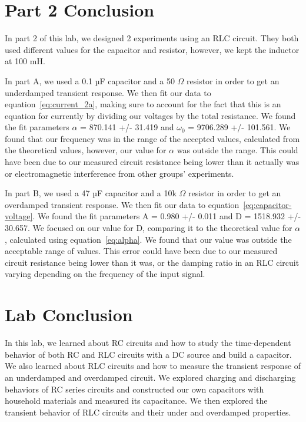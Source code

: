 \documentclass[11pt]{article}
\let\oldsection\section
\renewcommand\section{\clearpage\oldsection}
\begin{document}
    \section{Part 2 Conclusion}\label{sec:part2_conclusion}
    In part 2 of this lab, we designed 2 experiments using an RLC circuit. They both used different values for the capacitor and resistor, however, we kept the inductor at 100 mH.

    In part A, we used a  0.1 µF capacitor and a 50 $\Omega$ resistor in order to get an underdamped transient response. We then fit our data to equation~\ref{eq:current_2a}, making sure to account for the fact that this is an equation for currently by dividing our voltages by the total resistance. We found the fit parameters $\alpha$ = 870.141 +/- 31.419 and $\omega_0$ = 9706.289 +/- 101.561. We found that our frequency was in the range of the accepted values, calculated from the theoretical values, however, our value for $\alpha$ was outside the range. This could have been due to our measured circuit resistance being lower than it actually was or electromagnetic interference from other groups’ experiments.

    In part B, we used a 47 µF capacitor and a 10k $\Omega$ resistor in order to get an overdamped transient response. We then fit our data to equation~\ref{eq:capacitor-voltage}. We found the fit parameters A = 0.980 +/- 0.011 and D = 1518.932 +/- 30.657. We focused on our value for D, comparing it to the theoretical value for $\alpha$, calculated using equation~\ref{eq:alpha}. We found that our value was outside the acceptable range of values. This error could have been due to our measured circuit resistance being lower than it was, or the damping ratio in an RLC circuit varying depending on the frequency of the input signal.

    \section{Lab Conclusion}\label{sec:conclusion}
    In this lab, we learned about RC circuits and how to study the time-dependent behavior of both RC and RLC circuits with a DC source and build a capacitor. We also learned about RLC circuits and how to measure the transient response of an underdamped and overdamped circuit. We explored charging and discharging behaviors of RC series circuits and constructed our own capacitors with household materials and measured its capacitance. We then explored the transient behavior of RLC circuits and their under and overdamped properties.
\end{document}
